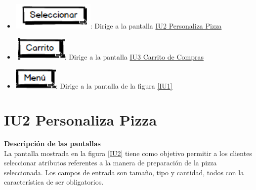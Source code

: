 		\begin{itemize}

			\item \includegraphics[scale=0.500]{imagenes/iconografia/Seleccionar.png}: Dirige a la pantalla \hyperlink{IU2}{IU2 Personaliza Pizza}
			\item \includegraphics[scale=0.500]{imagenes/iconografia/Carrito.png}: Dirige a la pantalla \hyperlink{IU3}{IU3 Carrito de Compras}
			\item \includegraphics[scale=0.500]{imagenes/iconografia/Menu.png}: Dirige a la pantalla de la figura \ref{IU1}

		\end{itemize}
	
	\hypertarget{IU2}{}
	\section{IU2 Personaliza Pizza}
	
	\noindent \textbf{Descripción de las pantallas}\\
	
	La pantalla mostrada en la figura \ref{IU2} tiene como objetivo permitir a los clientes seleccionar atributos referentes a la manera de preparación de la pizza seleccionada.
	Los campos de entrada son tamaño, tipo y cantidad, todos con la característica de ser obligatorios.
	
